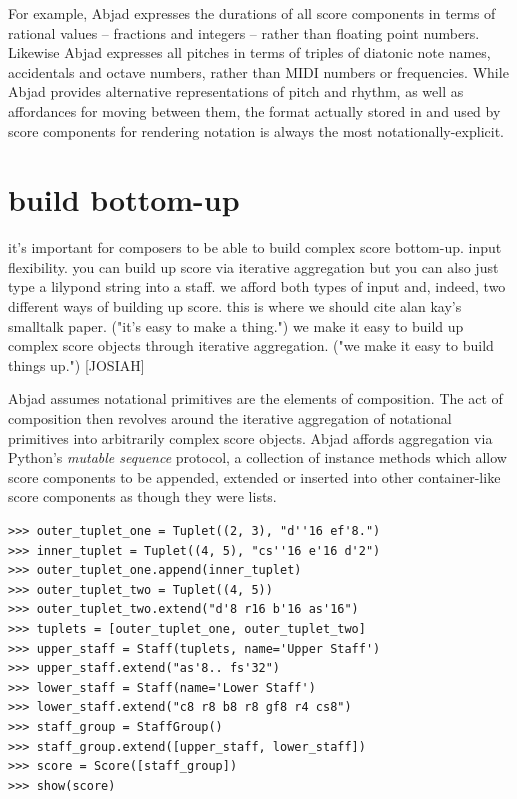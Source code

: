 \documentclass{article}
\begin{document}
For example, Abjad expresses the durations of all score components in terms of
rational values -- fractions and integers -- rather than floating point
numbers. Likewise Abjad expresses all pitches in terms of triples of diatonic
note names, accidentals and octave numbers, rather than MIDI numbers or
frequencies. While Abjad provides alternative representations of pitch and
rhythm, as well as affordances for moving between them, the format actually
stored in and used by score components for rendering notation is always the
most notationally-explicit.

\section{build bottom-up}

it's important for composers to be able to build complex
score bottom-up. input flexibility. you can build up score via iterative
aggregation but you can also just type a lilypond string into a staff. we
afford both types of input and, indeed, two different ways of building up
score. this is where we should cite alan kay's smalltalk paper. ("it's easy to
make a thing.") we make it easy to build up complex score objects through
iterative aggregation. ("we make it easy to build things up.") [JOSIAH]

\hrulefill\vspace{5pt}

Abjad assumes notational primitives are the elements of composition. The act of
composition then revolves around the iterative aggregation of notational
primitives into arbitrarily complex score objects. Abjad affords aggregation
via Python's \emph{mutable sequence} protocol, a collection of instance methods
which allow score components to be appended, extended or inserted into other
container-like score components as though they were lists.

\begin{lstlisting}
>>> outer_tuplet_one = Tuplet((2, 3), "d''16 ef'8.")
>>> inner_tuplet = Tuplet((4, 5), "cs''16 e'16 d'2")
>>> outer_tuplet_one.append(inner_tuplet)
>>> outer_tuplet_two = Tuplet((4, 5))
>>> outer_tuplet_two.extend("d'8 r16 b'16 as'16")
>>> tuplets = [outer_tuplet_one, outer_tuplet_two]
>>> upper_staff = Staff(tuplets, name='Upper Staff')
>>> upper_staff.extend("as'8.. fs'32")
>>> lower_staff = Staff(name='Lower Staff')
>>> lower_staff.extend("c8 r8 b8 r8 gf8 r4 cs8")
>>> staff_group = StaffGroup()
>>> staff_group.extend([upper_staff, lower_staff])
>>> score = Score([staff_group])
>>> show(score)
\end{lstlisting}
\end{document}
